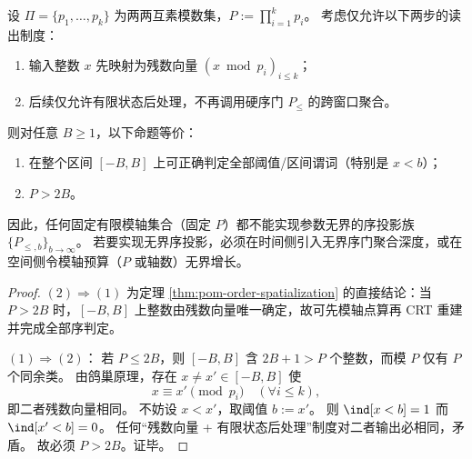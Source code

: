 \begin{theorem}\label{thm:conclusion-crt-threshold-necessary-sufficient-for-order-readout}
设 \(\Pi=\{p_1,\dots,p_k\}\) 为两两互素模数集，\(P:=\prod_{i=1}^k p_i\)。
考虑仅允许以下两步的读出制度：
\begin{enumerate}
  \item 输入整数 \(x\) 先映射为残数向量 \((x\bmod p_i)_{i\le k}\)；
  \item 后续仅允许有限状态后处理，不再调用硬序门 \(P_{\le}\) 的跨窗口聚合。
\end{enumerate}
则对任意 \(B\ge 1\)，以下命题等价：
\begin{enumerate}
  \item 在整个区间 \([-B,B]\) 上可正确判定全部阈值/区间谓词（特别是 \(x<b\)）；
  \item \(P>2B\)。
\end{enumerate}
因此，任何固定有限模轴集合（固定 \(P\)）都不能实现参数无界的序投影族 \(\{P_{\le,b}\}_{b\to\infty}\)。
若要实现无界序投影，必须在时间侧引入无界序门聚合深度，或在空间侧令模轴预算（\(P\) 或轴数）无界增长。
\end{theorem}
\begin{proof}
\((2)\Rightarrow(1)\) 为定理 \ref{thm:pom-order-spatialization} 的直接结论：当 \(P>2B\) 时，\([-B,B]\) 上整数由残数向量唯一确定，故可先模轴点算再 CRT 重建并完成全部序判定。

\((1)\Rightarrow(2)\)：
若 \(P\le 2B\)，则 \([-B,B]\) 含 \(2B+1>P\) 个整数，而模 \(P\) 仅有 \(P\) 个同余类。
由鸽巢原理，存在 \(x\neq x'\in[-B,B]\) 使
\[
x\equiv x'\pmod{p_i}\quad(\forall i\le k),
\]
即二者残数向量相同。
不妨设 \(x<x'\)，取阈值 \(b:=x'\)。
则 \(\ind[x<b]=1\) 而 \(\ind[x'<b]=0\)。
任何“残数向量 + 有限状态后处理”制度对二者输出必相同，矛盾。
故必须 \(P>2B\)。证毕。
\end{proof}

